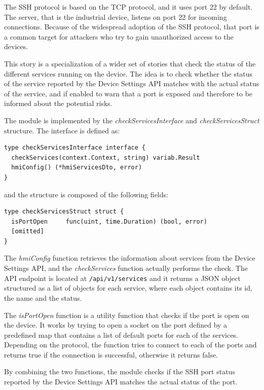 The SSH protocol is based on the TCP protocol, and it uses port 22 by default. The server, that is the industrial device, listens on port 22 for incoming connections. Because of the widespread adoption of the SSH protocol, that port is a common target for attackers who try to gain unauthorized access to the devices.

This story is a specialization of a wider set of stories that check the status of the different services running on the device. The idea is to check whether the status of the service reported by the Device Settings API matches with the actual status of the service, and if enabled to warn that a port is exposed and therefore to be informed about the potential risks.

The module is implemented by the \textit{checkServicesInterface} and \textit{checkServicesStruct} structure. The interface is defined as:

\begin{lstlisting}[style=golang]
type checkServicesInterface interface {
  checkServices(context.Context, string) variab.Result
  hmiConfig() (*hmiServicesDto, error)
}
\end{lstlisting}

and the structure is composed of the following fields:

\begin{lstlisting}[style=golang]
type checkServicesStruct struct {
  isPortOpen     func(uint, time.Duration) (bool, error)
  [omitted]
}
\end{lstlisting}

The \textit{hmiConfig} function retrieves the information about services from the Device Settings API, and the \textit{checkServices} function actually performs the check. The API endpoint is located at \texttt{/api/v1/services} and it returns a JSON object structured as a list of objects for each service, where each object contains its id, the name and the status.

The \textit{isPortOpen} function is a utility function that checks if the port is open on the device. It works by trying to open a socket on the port defined by a predefined map that contains a list of default ports for each of the services. Depending on the protocol, the function tries to connect to each of the ports and returns true if the connection is successful, otherwise it returns false.

By combining the two functions, the module checks if the SSH port status reported by the Device Settings API matches the actual status of the port.

